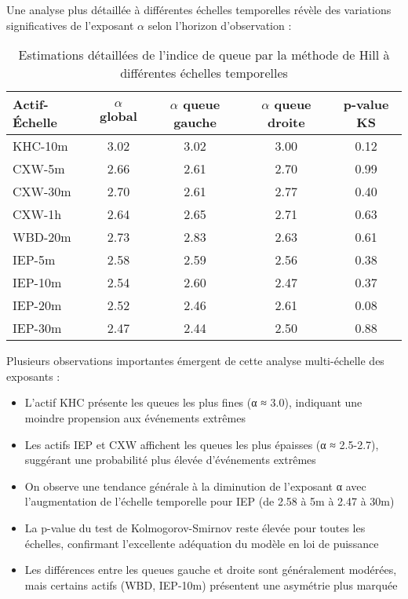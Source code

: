 \documentclass[12pt,a4paper]{article}
\theoremstyle{definition}
\theoremstyle{remark}
\begin{document}
Une analyse plus détaillée à différentes échelles temporelles révèle des variations significatives de l'exposant $\alpha$ selon l'horizon d'observation :

\begin{table}[h!]
\centering
\begin{tabular}{lcccc}
\toprule
Actif-Échelle & $\alpha$ global & $\alpha$ queue gauche & $\alpha$ queue droite & p-value KS \\
\midrule
KHC-10m & 3.02 & 3.02 & 3.00 & 0.12 \\
\midrule
CXW-5m & 2.66 & 2.61 & 2.70 & 0.99 \\
CXW-30m & 2.70 & 2.61 & 2.77 & 0.40 \\
CXW-1h & 2.64 & 2.65 & 2.71 & 0.63 \\
\midrule
WBD-20m & 2.73 & 2.83 & 2.63 & 0.61 \\
\midrule
IEP-5m & 2.58 & 2.59 & 2.56 & 0.38 \\
IEP-10m & 2.54 & 2.60 & 2.47 & 0.37 \\
IEP-20m & 2.52 & 2.46 & 2.61 & 0.08 \\
IEP-30m & 2.47 & 2.44 & 2.50 & 0.88 \\
\bottomrule
\end{tabular}
\caption{Estimations détaillées de l'indice de queue par la méthode de Hill à différentes échelles temporelles}
\label{tab:hill_detail}
\end{table}

Plusieurs observations importantes émergent de cette analyse multi-échelle des exposants :

\begin{itemize}
    \item L'actif KHC présente les queues les plus fines (α ≈ 3.0), indiquant une moindre propension aux événements extrêmes
    \item Les actifs IEP et CXW affichent les queues les plus épaisses (α ≈ 2.5-2.7), suggérant une probabilité plus élevée d'événements extrêmes
    \item On observe une tendance générale à la diminution de l'exposant α avec l'augmentation de l'échelle temporelle pour IEP (de 2.58 à 5m à 2.47 à 30m)
    \item La p-value du test de Kolmogorov-Smirnov reste élevée pour toutes les échelles, confirmant l'excellente adéquation du modèle en loi de puissance
    \item Les différences entre les queues gauche et droite sont généralement modérées, mais certains actifs (WBD, IEP-10m) présentent une asymétrie plus marquée
\end{itemize}
\end{document}
